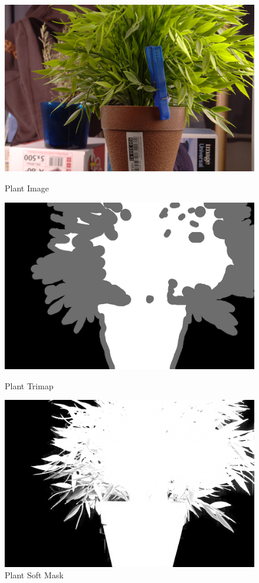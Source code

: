 \documentclass[a4paper]{article}
\begin{document}
\begin{figure}[h]
    \begin{minipage}{0.33\textwidth}
        \includegraphics[width=\textwidth]{target.jpg}
        \caption{Plant Image}
    \end{minipage}
    \begin{minipage}{0.33\textwidth}
        \includegraphics[width=\textwidth]{trimap.png}
        \caption{Plant Trimap}
    \end{minipage}
    \begin{minipage}{0.33\textwidth}
        \includegraphics[width=\textwidth]{mask.png}
        \caption{Plant Soft Mask}
    \end{minipage}
\end{figure}
\end{document}
